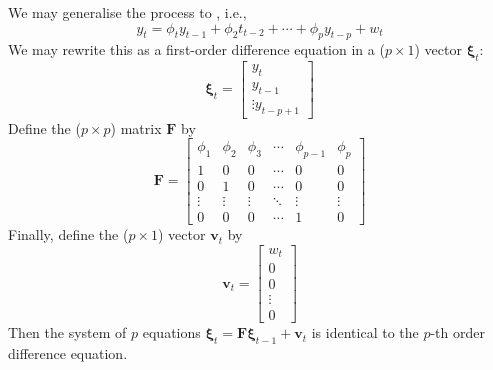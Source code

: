 We may generalise the process to , i.e.,
\begin{equation}
y_t = \phi_t y_{t-1} + \phi_2 t_{t-2} + \cdots + \phi_p y_{t-p} + w_t \nonumber
\end{equation}
We may rewrite this as a first-order difference equation in a ($p \times 1$) vector $\bm{\xi}_t$:
\begin{equation}
\bm{\xi}_t = 
\begin{bmatrix}
y_t \\
y_{t-1} \\ 
\vdots
y_{t-p+1}
\end{bmatrix} \nonumber
\end{equation}
Define the ($p \times p$) matrix $\bm{F}$ by
\begin{equation}
\bm{F} =
\begin{bmatrix}
\phi_1 & \phi_2 & \phi_3 & \cdots & \phi_{p-1} & \phi_p \\
1 & 0 & 0 & \cdots & 0 & 0 \\
0 & 1 & 0 & \cdots & 0 & 0 \\
\vdots & \vdots & \vdots & \ddots & \vdots & \vdots \\
0 & 0 & 0 & \cdots & 1 & 0
\end{bmatrix} \nonumber
\end{equation}
Finally, define the ($p \times 1$) vector $\bm{v}_t$ by
\begin{equation}
\bm{v}_t =
\begin{bmatrix}
w_t \\
0 \\
0 \\
\vdots \\
0
\end{bmatrix} \nonumber
\end{equation}
Then the system of $p$ equations $\bm{\xi}_t = \bm{F} \bm{\xi}_{t-1} + \bm{v}_t$ is identical to the $p$-th order difference equation.